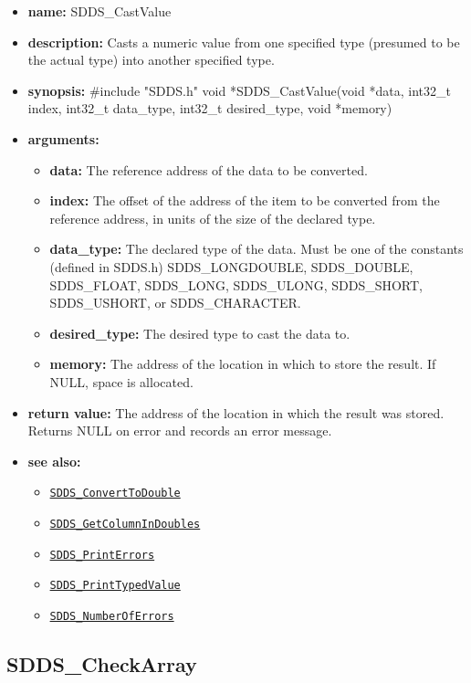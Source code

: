 \documentclass[11pt]{article}
\newcommand{\progref}[1]{\hyperref[SDDS_#1]{\tt SDDS\_#1}}
\begin{document}
\begin{itemize}
\item {\bf name:}\newline
SDDS\_CastValue
\item {\bf description:}\newline
Casts a numeric value from one specified type (presumed to be the actual type) into another specified type.
\item {\bf synopsis:} \#include "SDDS.h"\newline
 void *SDDS\_CastValue(void *data, int32\_t index, int32\_t data\_type, int32\_t desired\_type, void *memory)
\item {\bf arguments:}
\begin{itemize}
\item {\bf data:} The reference address of the data to be converted.
\item {\bf index:} The offset of the address of the item to be converted from the reference address, in units of the size of the declared type.
\item {\bf data\_type:} The declared type of the data. Must be one of the constants (defined in SDDS.h) SDDS\_LONGDOUBLE, SDDS\_DOUBLE, SDDS\_FLOAT, SDDS\_LONG, SDDS\_ULONG, SDDS\_SHORT, SDDS\_USHORT, or SDDS\_CHARACTER.
\item {\bf desired\_type:} The desired type to cast the data to.
\item {\bf memory:} The address of the location in which to store the result. If NULL, space is allocated.
\end{itemize}
\item {\bf return value:}\newline
The address of the location in which the result was stored. Returns NULL on error and records an error message.
\item {\bf see also:}
\begin{itemize}
\item \progref{ConvertToDouble}
\item \progref{GetColumnInDoubles}
\item \progref{PrintErrors}
\item \progref{PrintTypedValue}
\item \progref{NumberOfErrors}
\end{itemize}
\end{itemize}

\subsection{SDDS\_CheckArray}
\label{SDDS_CheckArray}
\end{document}
